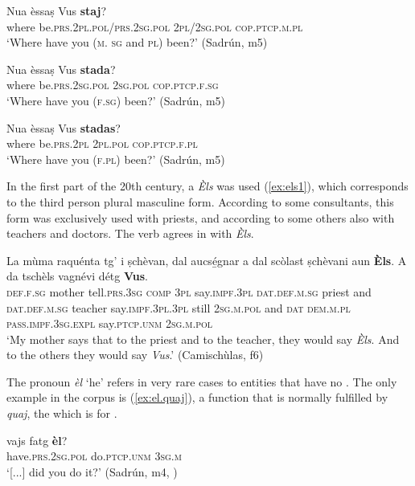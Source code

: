 \ea
\label{ex:vus1}
\gll  Nua èssaṣ Vus \textbf{staj}?\\
 where be.\textsc{prs.2pl.pol/prs.2sg.pol} \textsc{2pl/2sg.pol} \textsc{cop.ptcp.m.pl}\\
\glt `Where have you (\textsc{m. sg} and \textsc{pl}) been?' (Sadrún, m5)
\z

\ea
\label{ex:vus2}
\gll Nua èssaṣ Vus \textbf{stada}?\\
where be.\textsc{prs.2sg.pol} \textsc{2sg.pol} \textsc{cop.ptcp.f.sg}\\
\glt `Where have you (\textsc{f.sg}) been?' (Sadrún, m5)
\z

\ea
\label{ex:vus3}
\gll Nua èssaṣ Vus \textbf{stadas}?\\
where be.\textsc{prs.2pl} \textsc{2pl.pol} \textsc{cop.ptcp.f.pl}\\
\glt `Where have you (\textsc{f.pl}) been?' (Sadrún, m5)
\z

In the first part of the 20th century, a  \textit{Èls} was used (\ref{ex:els1}), which corresponds to the third person plural masculine form. According to some consultants, this form was exclusively used with priests, and according to some others also with teachers and doctors. The verb agrees in  with \textit{Èls}.

\ea
\label{ex:els1}
\gll La mùma raquénta tg' i ṣchèvan, dal aucs{\'e̱}gnar a dal scòlast ṣchèvani aun \textbf{Èls}. A da tschèls vagnévi détg \textbf{Vus}.\\
\textsc{def.f.sg} mother tell.\textsc{prs.3sg} \textsc{comp} \textsc{3pl} say.\textsc{impf.3pl} \textsc{dat.def.m.sg} priest and  \textsc{dat.def.m.sg} teacher say.\textsc{impf.3pl.3pl} still \textsc{2sg.m.pol} and \textsc{dat} \textsc{dem.m.pl} \textsc{pass.impf.3sg.expl} say.\textsc{ptcp.unm} \textsc{2sg.m.pol}\\
\glt `My mother says that to the priest and to the teacher, they would say \textit{Èls}. And to the others they would say \textit{Vus}.' (Camischùlas, f6)
\z

The pronoun \textit{èl} `he' refers in very rare cases to entities that have no . The only example in the corpus is (\ref{ex:el.quaj}), a function that is normally fulfilled by \textit{quaj}, the  which is  for .

\ea
\label{ex:el.quaj}
\gll [...] vajs fatg \textbf{èl}?\\
{} have.\textsc{prs.2sg.pol} do.\textsc{ptcp.unm} \textsc{3sg.m}\\
\glt `[...] did you do it?' (Sadrún, m4, )
\z

